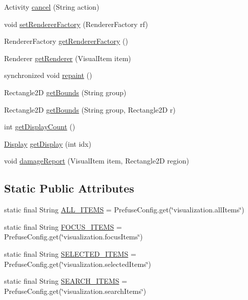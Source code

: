\begin{DoxyCompactItemize}
\item 
\-Activity \hyperlink{classprefuse_1_1_visualization_aa66246fc914c9884b6ed04cda192443a}{cancel} (\-String action)
\item 
void \hyperlink{classprefuse_1_1_visualization_a244df5451b60bb17468e4e67c9fda8b4}{set\-Renderer\-Factory} (\-Renderer\-Factory rf)
\item 
\-Renderer\-Factory \hyperlink{classprefuse_1_1_visualization_a02dc49900373dd5e180ed6773a04c605}{get\-Renderer\-Factory} ()
\item 
\-Renderer \hyperlink{classprefuse_1_1_visualization_a7d00157cb1475616b625ede59cdae8d5}{get\-Renderer} (\-Visual\-Item item)
\item 
synchronized void \hyperlink{classprefuse_1_1_visualization_a77146c0f22cfd4bd6bace12fc0a0b3db}{repaint} ()
\item 
\-Rectangle2\-D \hyperlink{classprefuse_1_1_visualization_ad600792ce94da86b4feb818bfffaf4aa}{get\-Bounds} (\-String group)
\item 
\-Rectangle2\-D \hyperlink{classprefuse_1_1_visualization_a253abedc42e162023540faefb313ea9e}{get\-Bounds} (\-String group, \-Rectangle2\-D r)
\item 
int \hyperlink{classprefuse_1_1_visualization_a19b4867842a838d8a97eb3319f0466a9}{get\-Display\-Count} ()
\item 
\hyperlink{classprefuse_1_1_display}{\-Display} \hyperlink{classprefuse_1_1_visualization_a744c505a2f04c53a98e52fc4f8972357}{get\-Display} (int idx)
\item 
void \hyperlink{classprefuse_1_1_visualization_a8c0cc6ad86733e91d3796d186f95581b}{damage\-Report} (\-Visual\-Item item, \-Rectangle2\-D region)
\end{DoxyCompactItemize}
\subsection*{\-Static \-Public \-Attributes}
\begin{DoxyCompactItemize}
\item 
static final \-String \hyperlink{classprefuse_1_1_visualization_abe77d2faaf2032e025bac812d4eb0901}{\-A\-L\-L\-\_\-\-I\-T\-E\-M\-S} = \-Prefuse\-Config.\-get(\char`\"{}visualization.\-all\-Items\char`\"{})
\item 
static final \-String \hyperlink{classprefuse_1_1_visualization_af0008fce03c57f8b98e3b697f4134ded}{\-F\-O\-C\-U\-S\-\_\-\-I\-T\-E\-M\-S} = \-Prefuse\-Config.\-get(\char`\"{}visualization.\-focus\-Items\char`\"{})
\item 
static final \-String \hyperlink{classprefuse_1_1_visualization_ad3377de1360bcd1a227089406578b922}{\-S\-E\-L\-E\-C\-T\-E\-D\-\_\-\-I\-T\-E\-M\-S} = \-Prefuse\-Config.\-get(\char`\"{}visualization.\-selected\-Items\char`\"{})
\item 
static final \-String \hyperlink{classprefuse_1_1_visualization_a323513dc089f3642f95b17ddf6da3881}{\-S\-E\-A\-R\-C\-H\-\_\-\-I\-T\-E\-M\-S} = \-Prefuse\-Config.\-get(\char`\"{}visualization.\-search\-Items\char`\"{})
\end{DoxyCompactItemize}
